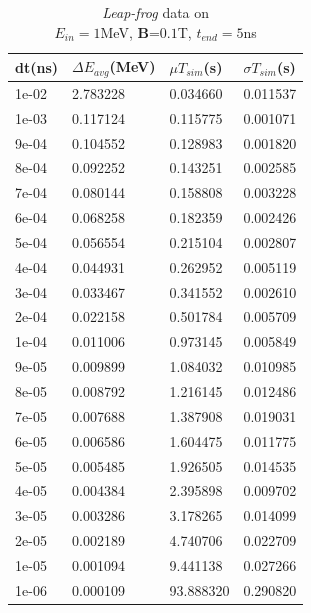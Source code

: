 \documentclass{book}
\begin{document}
\begin{table}[H]
    \centering
    \begin{tabular}{|l|l|l|l|}
    \hline
    dt(ns)       & $\Delta E_{avg}$(MeV) & $\mu T_{sim}$(s)    & $\sigma T_{sim}$(s) \\\hline
        1e-02 & 2.783228     & 0.034660  & 0.011537 \\ \hline
        1e-03 & 0.117124     & 0.115775  & 0.001071 \\ \hline
        9e-04 & 0.104552     & 0.128983  & 0.001820 \\  \hline
        8e-04 & 0.092252     & 0.143251  & 0.002585 \\ \hline
        7e-04 & 0.080144     & 0.158808  & 0.003228 \\ \hline
        6e-04 & 0.068258     & 0.182359  & 0.002426 \\\hline
        5e-04 & 0.056554     & 0.215104  & 0.002807 \\\hline
        4e-04 & 0.044931     & 0.262952  & 0.005119 \\\hline
        3e-04 & 0.033467     & 0.341552  & 0.002610 \\\hline
        2e-04 & 0.022158     & 0.501784  & 0.005709 \\\hline
        1e-04 & 0.011006     & 0.973145  & 0.005849 \\\hline
        9e-05 & 0.009899     & 1.084032  & 0.010985 \\\hline
        8e-05 & 0.008792     & 1.216145  & 0.012486 \\\hline
        7e-05 & 0.007688     & 1.387908  & 0.019031 \\\hline
        6e-05 & 0.006586     & 1.604475  & 0.011775 \\\hline
        5e-05 & 0.005485     & 1.926505  & 0.014535 \\\hline
        4e-05 & 0.004384     & 2.395898  & 0.009702 \\\hline
        3e-05 & 0.003286     & 3.178265  & 0.014099 \\\hline
        2e-05 & 0.002189     & 4.740706  & 0.022709 \\\hline
        1e-05 & 0.001094     & 9.441138  & 0.027266 \\\hline
        1e-06 & 0.000109     & 93.888320 & 0.290820 \\ \hline
    \end{tabular}
    \caption{\textit{Leap-frog} data on \\$E_{in}=1$MeV, \textbf{B}=$0.1$T, $t_{end}=5$ns}
    \label{tab:lf_mag_table}
\end{table}
\end{document}
